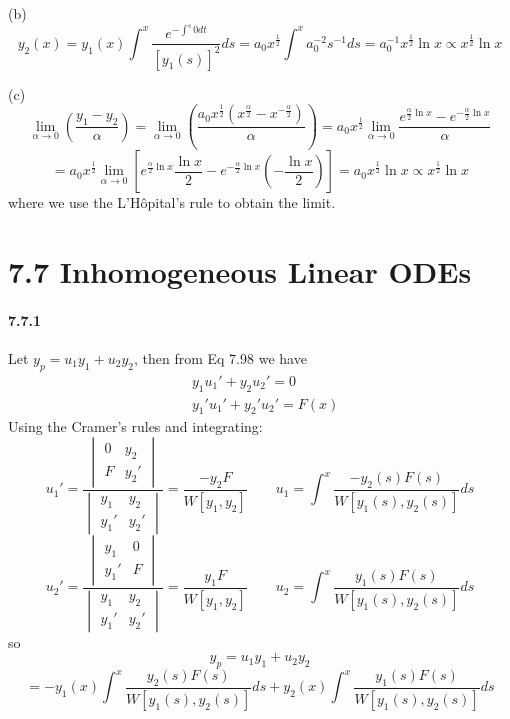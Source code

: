 \documentclass[a4paper]{article}
\begin{document}
(b)
\[
y_2(x)=y_1(x)\int^x\frac{e^{-\int^s0dt}}{[y_1(s)]^2}ds=a_0x^\frac{1}{2}\int^xa_0^{-2}s^{-1}ds=a_0^{-1}x^{\frac{1}{2}}\ln x\propto x^{\frac{1}{2}}\ln x
\]

(c)
\[
\lim_{\alpha\to0}\left(\frac{y_1-y_2}{\alpha}\right)=\lim_{\alpha\to0}\left(\frac{a_0x^{\frac{1}{2}}(x^{\frac{\alpha}{2}}-x^{-\frac{\alpha}{2}})}{\alpha} \right)=a_0x^{\frac{1}{2}}\lim_{\alpha\to0}\frac{e^{\frac{\alpha}{2}\ln x}-e^{-\frac{\alpha}{2}\ln x}}{\alpha}
\]
\[
=a_0x^{\frac{1}{2}}\lim_{\alpha\to0}\left[e^{\frac{\alpha}{2}\ln x}\frac{\ln x}{2}-e^{-\frac{\alpha}{2}\ln x}(-\frac{\ln x}{2}) \right]=a_0x^{\frac{1}{2}}\ln x\propto x^{\frac{1}{2}}\ln x
\]
where we use the L'Hôpital's rule to obtain the limit.

\section*{7.7 Inhomogeneous Linear ODEs }

\paragraph{7.7.1}
\renewcommand{\arraystretch}{1}
Let $y_p=u_1y_1+u_2y_2$, then from Eq 7.98 we have
\begin{align*}
    & y_1u_1'+y_2u_2'=0\\
    & y_1'u_1'+y_2'u_2'=F(x)
\end{align*}
Using the Cramer's rules and integrating:
\[
u_1'=\frac{
\begin{vmatrix}
0&y_2\\F&y_2'
\end{vmatrix}
}{
\begin{vmatrix}
y_1&y_2\\
y_1'&y_2'
\end{vmatrix}
}=
\frac{-y_2F}{W[y_1,y_2]}\qquad
u_1=\int^x\frac{-y_2(s)F(s)}{W[y_1(s),y_2(s)]}ds
\]
\[
u_2'=\frac{
\begin{vmatrix}
y_1&0\\y_1'&F
\end{vmatrix}
}{
\begin{vmatrix}
y_1&y_2\\
y_1'&y_2'
\end{vmatrix}
}=
\frac{y_1F}{W[y_1,y_2]}\qquad
u_2=\int^x\frac{y_1(s)F(s)}{W[y_1(s),y_2(s)]}ds
\]
so
\[
y_p=u_1y_1+u_2y_2\]
\[=-y_1(x)\int^x\frac{y_2(s)F(s)}{W[y_1(s),y_2(s)]}ds+y_2(x)\int^x\frac{y_1(s)F(s)}{W[y_1(s),y_2(s)]}ds
\]
\end{document}
